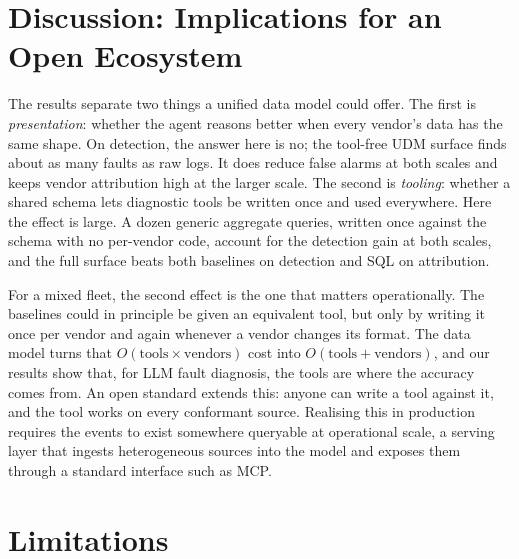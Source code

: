 \documentclass[conference]{IEEEtran}
\begin{document}
\section{Discussion: Implications for an Open Ecosystem}

The results separate two things a unified data model could offer. The first is
\emph{presentation}: whether the agent reasons better when every vendor's data has
the same shape. On detection, the answer here is no; the tool-free UDM surface finds
about as many faults as raw logs. It does reduce false alarms at both scales and
keeps vendor attribution high at the larger scale. The second is \emph{tooling}:
whether a shared schema lets diagnostic tools be written once and used everywhere.
Here the effect is large. A dozen generic aggregate queries, written once against
the schema with no per-vendor code, account for the detection gain at both scales,
and the full surface beats both baselines on detection and SQL on attribution.

For a mixed fleet, the second effect is the one that matters operationally. The
baselines could in principle be given an equivalent tool, but only by writing it
once per vendor and again whenever a vendor changes its format. The data model turns
that $O(\text{tools} \times \text{vendors})$ cost into $O(\text{tools} +
\text{vendors})$, and our results show that, for LLM fault diagnosis, the tools are
where the accuracy comes from. An open standard extends this: anyone can write a
tool against it, and the tool works on every conformant source. Realising this in
production requires the events to exist somewhere queryable at operational scale,
a serving layer that ingests heterogeneous sources into the model and exposes them
through a standard interface such as MCP.

\section{Limitations}
\label{sec:limitations}
\end{document}
